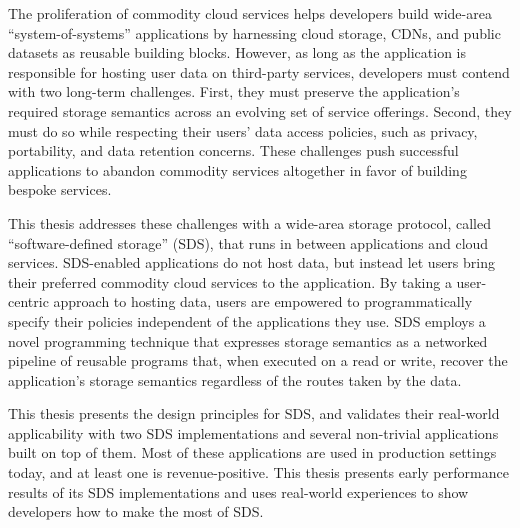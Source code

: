 The proliferation of commodity cloud services helps developers build
wide-area ``system-of-systems'' applications by harnessing
cloud storage, CDNs, and public datasets as reusable building blocks.
However, as long as the application is responsible for hosting user data
on third-party services, developers must contend with two
long-term challenges.  First, they must preserve the application's
required storage semantics across an evolving set of service
offerings.  Second, they must do so while respecting their users' data access
policies, such as privacy, portability, and data retention concerns.
These challenges push successful applications to abandon
commodity services altogether in favor of building bespoke services.

This thesis addresses these challenges with a wide-area storage protocol, called ``software-defined
storage'' (SDS), that runs in between applications and cloud services.
SDS-enabled applications do not host data, but instead let users
bring their preferred commodity cloud services to the application.  By taking a
user-centric approach to hosting data, users are empowered to programmatically
specify their policies independent of the applications they use.  SDS 
employs a novel programming technique that expresses storage semantics
as a networked pipeline of reusable 
programs that, when executed on a read or write, recover the application's storage
semantics regardless of the routes taken by the data.

This thesis presents the design principles for SDS, and validates their
real-world applicability with two SDS implementations and several non-trivial
applications built on top of them.  Most of these applications are used in
production settings today, and at least one is revenue-positive.  This thesis
presents early performance results of its SDS implementations and uses
real-world experiences to show developers how to make the most of SDS.
